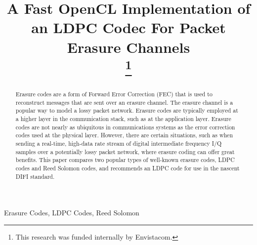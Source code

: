 \documentclass[conference]{IEEEtran}
\begin{document}
\title{A Fast OpenCL Implementation of an LDPC Codec For Packet Erasure Channels\\
\thanks{This research was funded internally by Envistacom.}
}

\author{
 }

\maketitle

\begin{abstract}
Erasure codes are a form of Forward Error Correction (FEC) that is used to reconstruct messages that are sent over an erasure channel.  The erasure channel is a popular way to model a lossy packet network.  Erasure codes are typically employed at a higher layer in the communication stack, such as at the application layer.  Erasure codes are not nearly as ubiquitous in communications systems as the error correction codes used at the physical layer.  However, there are certain situations, such as when sending a real-time, high-data rate stream of digital intermediate frequency I/Q samples over a potentially lossy packet network, where erasure coding can offer great benefits.  This paper compares two popular types of well-known erasure codes, LDPC codes and Reed Solomon codes, and recommends an LDPC code for use in the nascent DIFI \cite{DIFI2021IEEEStd4900-2021} standard.
\end{abstract}

\begin{IEEEkeywords}
Erasure Codes, LDPC Codes, Reed Solomon
\end{IEEEkeywords}
\end{document}
